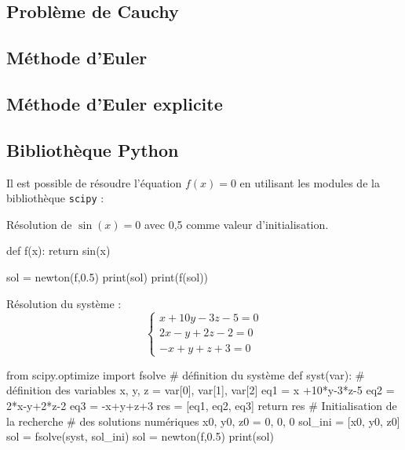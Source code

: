 \documentclass[10pt,fleqn]{article} %
\begin{document}

\vspace{2cm}
\pagestyle{fancy}
\thispagestyle{plain}


\subsection*{Problème de Cauchy}

\subsection*{Méthode d'Euler}

\subsection*{Méthode d'Euler explicite}


\subsection*{Bibliothèque Python}
Il est possible de résoudre l'équation $f(x)=0$ en utilisant les modules de la bibliothèque \texttt{scipy} :
\begin{py}
\begin{minipage}[c]{.45\linewidth}
Résolution de $\sin(x)=0$ avec 0,5 comme valeur d'initialisation.
\begin{python}
def f(x):
    return sin(x)
   
sol = newton(f,0.5)
print(sol)
print(f(sol))
\end{python}

Résolution du système : 
$$
\left\{\begin{array}{l} 
x+10y-3z-5 = 0 \\ 
2x-y+2z-2 = 0\\
 -x+y+z+3 = 0\end{array}\right.
 $$

\end{minipage}
\hfill
\begin{minipage}[c]{.45\linewidth}
\begin{python}
from scipy.optimize import fsolve
# définition du système
def syst(var): 
    # définition des variables
    x, y, z = var[0], var[1], var[2] 
    eq1 = x +10*y-3*z-5
    eq2 = 2*x-y+2*z-2
    eq3 = -x+y+z+3
    res = [eq1, eq2, eq3]
    return res
    # Initialisation de la recherche 
    # des solutions numériques
x0, y0, z0 = 0, 0, 0 
sol_ini = [x0, y0, z0]
sol = fsolve(syst, sol_ini)
sol = newton(f,0.5)
print(sol)
\end{python}
\end{minipage}

\end{py}
\end{document}
